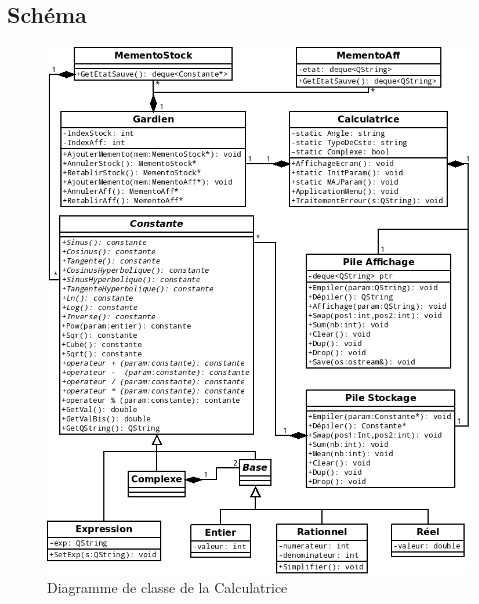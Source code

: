 \documentclass[a4paper,11pt]{report}
\begin{document}
		\subsection{Schéma}
			\begin{figure}[H]
				\center
				\includegraphics[width=16cm]{UMLProjetLO21v3.png}
				\caption{Diagramme de classe de la Calculatrice}
			\end{figure}
\end{document}
